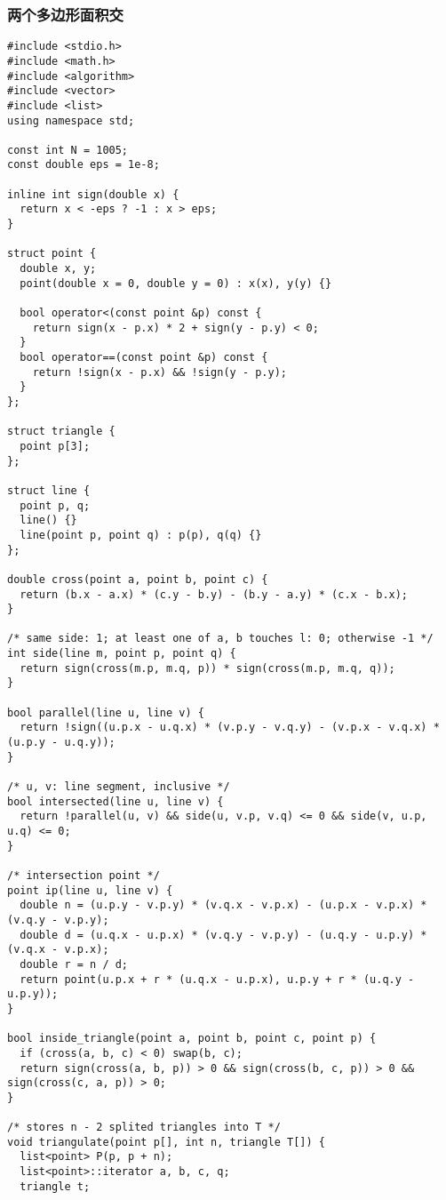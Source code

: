 \subsubsection{两个多边形面积交}
\begin{verbatim}
#include <stdio.h>
#include <math.h>
#include <algorithm>
#include <vector>
#include <list>
using namespace std;

const int N = 1005;
const double eps = 1e-8;

inline int sign(double x) { 
  return x < -eps ? -1 : x > eps; 
}

struct point {
  double x, y;
  point(double x = 0, double y = 0) : x(x), y(y) {}

  bool operator<(const point &p) const { 
    return sign(x - p.x) * 2 + sign(y - p.y) < 0; 
  }
  bool operator==(const point &p) const { 
    return !sign(x - p.x) && !sign(y - p.y); 
  }
};

struct triangle {
  point p[3];
};

struct line {
  point p, q;
  line() {}
  line(point p, point q) : p(p), q(q) {}
};

double cross(point a, point b, point c) {
  return (b.x - a.x) * (c.y - b.y) - (b.y - a.y) * (c.x - b.x);
}

/* same side: 1; at least one of a, b touches l: 0; otherwise -1 */
int side(line m, point p, point q) {
  return sign(cross(m.p, m.q, p)) * sign(cross(m.p, m.q, q));
}

bool parallel(line u, line v) {
  return !sign((u.p.x - u.q.x) * (v.p.y - v.q.y) - (v.p.x - v.q.x) * (u.p.y - u.q.y));
}

/* u, v: line segment, inclusive */
bool intersected(line u, line v) {
  return !parallel(u, v) && side(u, v.p, v.q) <= 0 && side(v, u.p, u.q) <= 0;
}

/* intersection point */
point ip(line u, line v) {
  double n = (u.p.y - v.p.y) * (v.q.x - v.p.x) - (u.p.x - v.p.x) * (v.q.y - v.p.y);
  double d = (u.q.x - u.p.x) * (v.q.y - v.p.y) - (u.q.y - u.p.y) * (v.q.x - v.p.x);
  double r = n / d;
  return point(u.p.x + r * (u.q.x - u.p.x), u.p.y + r * (u.q.y - u.p.y));
}

bool inside_triangle(point a, point b, point c, point p) {
  if (cross(a, b, c) < 0) swap(b, c);
  return sign(cross(a, b, p)) > 0 && sign(cross(b, c, p)) > 0 && sign(cross(c, a, p)) > 0;
}

/* stores n - 2 splited triangles into T */
void triangulate(point p[], int n, triangle T[]) {
  list<point> P(p, p + n);
  list<point>::iterator a, b, c, q;
  triangle t;


\end{verbatim}
